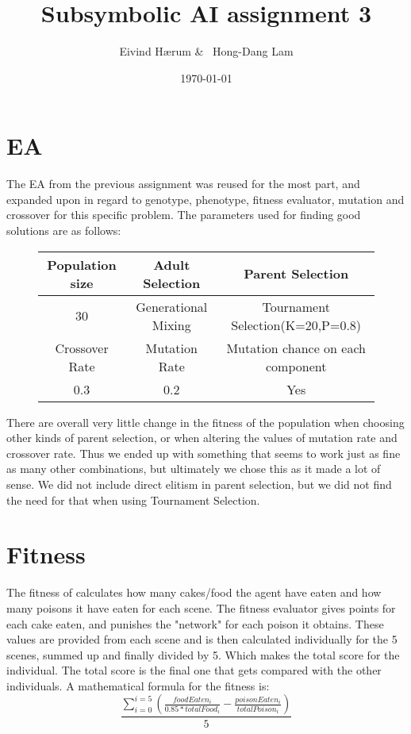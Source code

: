 \documentclass[12pt, a4paper]{article}
\title{Subsymbolic AI assignment 3}
\author{Eivind Hærum \& \ Hong-Dang Lam}
\date{\today} %
\begin{document}
\maketitle
% 
% 
\newpage

\tableofcontents
{}
\newpage

\section{EA}

The EA from the previous assignment was reused for the most part, and expanded upon in regard to genotype, phenotype, fitness evaluator, mutation and crossover for this specific problem. 
The parameters used for finding good solutions are as follows:

\begin{figure}[H]
	\begin{center}
	\begin{tabular}{c|c|c}
		Population size & Adult Selection & Parent Selection \\
		\hline
		30 & Generational Mixing  & Tournament Selection(K=20,P=0.8) \\
		\hline
		\hline
		Crossover Rate & Mutation Rate & Mutation chance on each component\\
		\hline
		0.3 & 0.2 & Yes\\
	\end{tabular}
	\end{center}
\end{figure}

There are overall very little change in the fitness of the population when choosing other kinds of parent selection, or when altering the values of mutation rate and crossover rate. Thus we ended up with something that seems to work just as fine as many other combinations, but ultimately we chose this as it made a lot of sense. We did not include direct elitism in parent selection, but we did not find the need for that when using Tournament Selection.


\section{Fitness}
The fitness of calculates how many cakes/food the agent have eaten and how many poisons it have eaten for each scene. The fitness evaluator gives points for each cake eaten, and punishes the "network" for each poison it obtains. These values are provided from each scene and is then calculated individually for the 5 scenes, summed up and finally divided by 5. Which makes the total score for the individual. The total score is the final one that gets compared with the other individuals.
A mathematical formula for the fitness is:
$$ \frac{\sum_{i=0}^{i =5}({\frac{foodEaten_i}{0.85 * totalFood_i} - \frac{poisonEaten_i}{totalPoison_i}})}{5} $$
\end{document}
